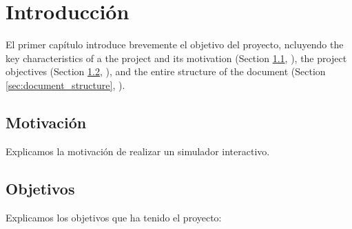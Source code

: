 \chead[]{}
\renewcommand{\headrulewidth}{0.5pt}

\lfoot[]{}
\cfoot[]{}
\rfoot[]{}
\renewcommand{\footrulewidth}{0pt}

\chapter{Introducción}
\label{ch:introduction}

El primer capítulo introduce brevemente el objetivo del proyecto, ncluyendo the key characteristics of a the project and its motivation (Section \ref{sec:background_and_motivation}, \textit{}), the project objectives (Section \ref{sec:objectives}, \textit{}), and the entire structure of the document (Section \ref{sec:document_structure}, \textit{}).

\section{Motivación}
\label{sec:background_and_motivation}
Explicamos la motivación de realizar un simulador interactivo.



\section{Objetivos}
\label{sec:objectives}

Explicamos los objetivos que ha tenido el proyecto:

